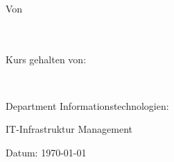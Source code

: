 

\begin{titlepage}
\begin{center}
    \vspace*{-5,7cm}
    \hspace*{-1,43cm}
    
    \vspace{2.3cm}
    

    \vspace{1cm}
    {\textbf{\Titel\\}}
    \vspace{2.4cm}
    
    {} \\
    \vspace{0.5cm}
    {}\\
    \vspace{0.5cm}
    Von\\
    \SchuelerName \\ \SchuelerPKZ\\
    \vspace{0.9cm}
    {\begin{singlespace}Kurs gehalten von:\\\end{singlespace}}
    {\begin{singlespace}\Lehrer\\\end{singlespace}}


\end{center}
{\raggedleft\vfill{\begin{singlespace}
     Department Informationstechnologien:\\
\end{singlespace}
 IT-Infrastruktur Management\\
 \begin{singlespace}
 Datum: \today\\
 
 
 \end{singlespace}
}\par
}
\end{titlepage}
